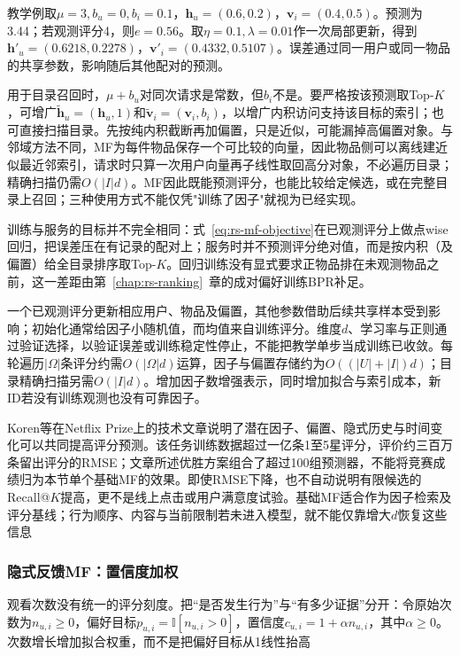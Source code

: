 教学例取$\mu=3,b_u=0,b_i=0.1$，$\bm h_u=(0.6,0.2)$，$\bm v_i=(0.4,0.5)$。预测为3.44；若观测评分4，则$e=0.56$。取$\eta=0.1,\lambda=0.01$作一次局部更新，得到$\bm h'_u=(0.6218,0.2278)$，$\bm v'_i=(0.4332,0.5107)$。误差通过同一用户或同一物品的共享参数，影响随后其他配对的预测。

用于目录召回时，$\mu+b_u$对同次请求是常数，但$b_i$不是。要严格按该预测取Top-$K$，可增广$\widetilde{\bm h}_u=(\bm h_u,1)$和$\widetilde{\bm v}_i=(\bm v_i,b_i)$，以增广内积访问支持该目标的索引；也可直接扫描目录。先按纯内积截断再加偏置，只是近似，可能漏掉高偏置对象。与邻域方法不同，MF为每件物品保存一个可比较的向量，因此物品侧可以离线建近似最近邻索引，请求时只算一次用户向量再子线性取回高分对象，不必遍历目录；精确扫描仍需$O(|I|d)$。MF因此既能预测评分，也能比较给定候选，或在完整目录上召回；三种使用方式不能仅凭"训练了因子"就视为已经实现。

训练与服务的目标并不完全相同：式~\eqref{eq:rs-mf-objective}在已观测评分上做点wise回归，把误差压在有记录的配对上；服务时并不预测评分绝对值，而是按内积（及偏置）给全目录排序取Top-$K$。回归训练没有显式要求正物品排在未观测物品之前，这一差距由第~\ref{chap:rs-ranking}~章的成对偏好训练BPR补足。

一个已观测评分更新相应用户、物品及偏置，其他参数借助后续共享样本受到影响；初始化通常给因子小随机值，而均值来自训练评分。维度$d$、学习率与正则通过验证选择，以验证误差或训练稳定性停止，不能把教学单步当成训练已收敛。每轮遍历$|\Omega|$条评分约需$O(|\Omega|d)$运算，因子与偏置存储约为$O((|U|+|I|)d)$；目录精确扫描另需$O(|I|d)$。增加因子数增强表示，同时增加拟合与索引成本，新ID若没有训练观测也没有可靠因子。

Koren等在Netflix Prize上的技术文章说明了潜在因子、偏置、隐式历史与时间变化可以共同提高评分预测。该任务训练数据超过一亿条1至5星评分，评价约三百万条留出评分的RMSE；文章所述优胜方案组合了超过100组预测器，不能将竞赛成绩归为本节单个基础MF的效果。即使RMSE下降，也不自动说明有限候选的Recall@$K$提高，更不是线上点击或用户满意度试验。基础MF适合作为因子检索及评分基线；行为顺序、内容与当前限制若未进入模型，就不能仅靠增大$d$恢复这些信息

\subsubsection{隐式反馈MF：置信度加权}
\label{sec:rs-implicit-mf}

观看次数没有统一的评分刻度。把“是否发生行为”与“有多少证据”分开：令原始次数为$n_{u,i}\geq0$，偏好目标$p_{u,i}=\mathbb I[n_{u,i}>0]$，置信度$c_{u,i}=1+\alpha n_{u,i}$，其中$\alpha\geq0$。次数增长增加拟合权重，而不是把偏好目标从1线性抬高

